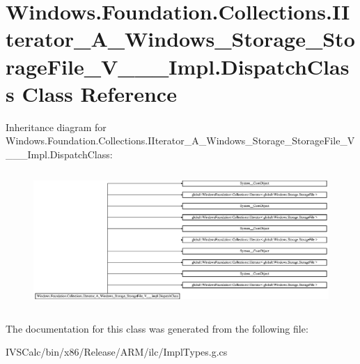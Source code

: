 \hypertarget{class_windows_1_1_foundation_1_1_collections_1_1_i_iterator___a___windows___storage___storage_fid6aae0f70d4175ae167a0b94450e4364}{}\section{Windows.\+Foundation.\+Collections.\+I\+Iterator\+\_\+\+A\+\_\+\+Windows\+\_\+\+Storage\+\_\+\+Storage\+File\+\_\+\+V\+\_\+\+\_\+\+\_\+\+Impl.\+Dispatch\+Class Class Reference}
\label{class_windows_1_1_foundation_1_1_collections_1_1_i_iterator___a___windows___storage___storage_fid6aae0f70d4175ae167a0b94450e4364}
Inheritance diagram for Windows.\+Foundation.\+Collections.\+I\+Iterator\+\_\+\+A\+\_\+\+Windows\+\_\+\+Storage\+\_\+\+Storage\+File\+\_\+\+V\+\_\+\+\_\+\+\_\+\+Impl.\+Dispatch\+Class\+:\begin{figure}[H]
\begin{center}
\leavevmode
\includegraphics[height=5.229202cm]{class_windows_1_1_foundation_1_1_collections_1_1_i_iterator___a___windows___storage___storage_fid6aae0f70d4175ae167a0b94450e4364}
\end{center}
\end{figure}


The documentation for this class was generated from the following file\+:\begin{DoxyCompactItemize}
\item 
I\+V\+S\+Calc/bin/x86/\+Release/\+A\+R\+M/ilc/Impl\+Types.\+g.\+cs\end{DoxyCompactItemize}
